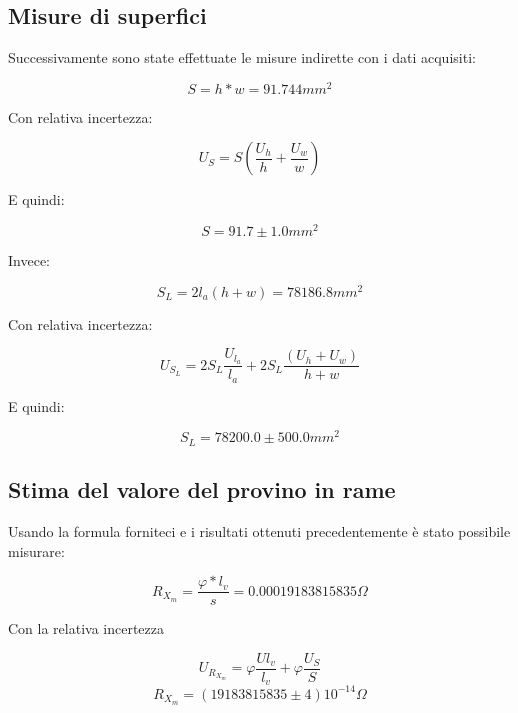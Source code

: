 \documentclass[a4paper]{article}
\begin{document}
\subsection{Misure di superfici}
Successivamente sono state effettuate le misure indirette con i dati acquisiti:
\begin{Large} 
	\begin{equation}
		S = h*w = 91.744 mm^2
	 \end{equation}
\end{Large}
Con relativa incertezza:
\begin{Large} 
	\begin{equation}
		U_{S} =S(\frac{U_h}{h}+\frac{U_w}{w})
	 \end{equation}
\end{Large}
E quindi: 
\begin{Large} 
	\begin{equation}
		S =91.7\pm 1.0mm^2
	 \end{equation}
\end{Large}
Invece:
\begin{Large} 
	\begin{equation}
		S_L= 2l_a(h+w) = 78186.8 mm^2
	 \end{equation}
\end{Large}
Con relativa incertezza:
\begin{Large} 
	\begin{equation}
		U_{S_L} =2S_L\frac{U_{l_a}}{l_a}+2S_L\frac{(U_h+U_w)}{h+w}
	 \end{equation}
\end{Large}
E quindi: 
\begin{Large} 
	\begin{equation}
		S_L =78200.0\pm 500.0mm^2
	 \end{equation}
\end{Large}
\subsection{Stima del valore del provino in rame}
Usando la formula forniteci e i risultati ottenuti precedentemente è stato possibile misurare:
\begin{Large}
	\begin{equation}
		R_{X_{m}} =\frac{\varphi*l_v}{s}= 0.00019183815835 \Omega
	 \end{equation}
\end{Large}
Con la relativa incertezza
\begin{Large}
	
	\begin{equation}
		U_{R_{X_{m}}} = \varphi\frac{U{l_v}}{l_v}+\varphi\frac{U_{S}}{S}
	 \end{equation}
	 \begin{equation}
		R_{X_{m}} = (19183815835 \pm 4)10^{-14} \Omega
	 \end{equation}
\end{Large}
\end{document}
